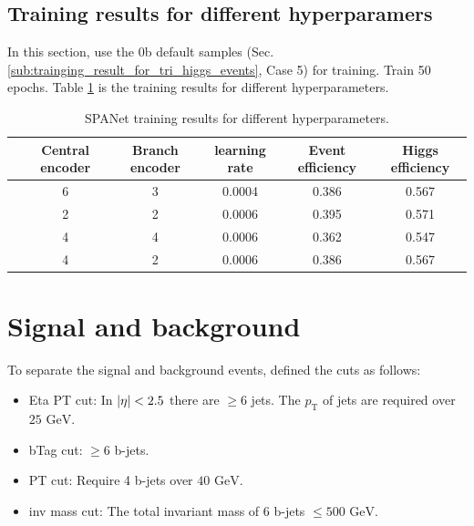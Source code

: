 \documentclass[12pt]{article}
\begin{document}
	\subsection{Training results for different hyperparamers}%
	\label{sub:training_results_for_different_hyperparamers}
		In this section, use the 0b default samples (Sec.\ref{sub:trainging_result_for_tri_higgs_events}, Case 5) for training. Train 50 epochs. Table \ref{tab:SPANet_hp_50ep} is the training results for different hyperparameters.
		
		\begin{table}[htpb]
			\centering
			\caption{SPANet training results for different hyperparameters.}
			\label{tab:SPANet_hp_50ep}
			\begin{tabular}{cccc|cc}
			 & Central encoder & Branch encoder & learning rate & Event efficiency & Higgs efficiency \\
			 \hline
			 &    6             &     3           &  0.0004             &   0.386               &    0.567              \\
			 &    2             &     2           &  0.0006             &   0.395               &    0.571              \\
			 &    4             &     4           &  0.0006             &   0.362               &    0.547             \\
			 &    4             &     2           &  0.0006             &   0.386               &    0.567             
			\end{tabular}
		\end{table}

\section{Signal and background}%
\label{sec:signal_and_background}
	To separate the signal and background events, defined the cuts as follows:
	\begin{itemize}
		\item Eta PT cut: In $\abs{\eta} < 2.5$ there are $\ge 6$ jets. The $p_\text{T}$ of jets are required over $25 \text{ GeV}$.
		\item bTag cut: $\ge 6$ b-jets.
		\item PT cut: Require 4 b-jets over $40 \text{ GeV}$.
		\item inv mass cut: The total invariant mass of 6 b-jets $\le 500 \text{ GeV}$.
	\end{itemize}
\end{document}
